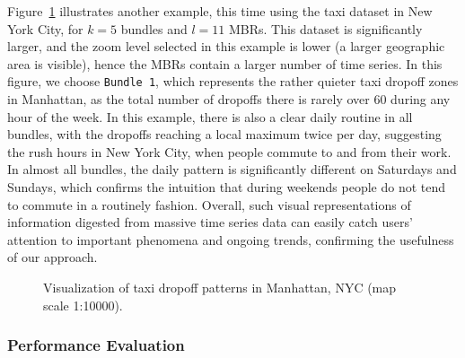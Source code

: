 Figure~\ref{fig:nyc_example} illustrates another example, this time using the taxi dataset in New York City, for $k=5$ bundles and $l=11$ MBRs. This dataset is significantly larger, and the zoom level selected in this example is lower (a larger geographic area is visible), hence the MBRs contain a larger number of time series. In this figure, we choose \texttt{Bundle 1}, which represents the rather quieter taxi dropoff zones in Manhattan, as the total number of dropoffs there is rarely over 60 during any hour of the week. In this example, there is also a clear daily routine in all bundles, with the dropoffs reaching a local maximum twice per day, suggesting the rush hours in New York City, when people commute to and from their work. In almost all bundles, the daily pattern is significantly different on Saturdays and Sundays, which confirms the intuition that during weekends people do not tend to commute in a routinely fashion. Overall, such visual representations of information digested from massive time series data can easily catch users' attention to important phenomena and ongoing trends, confirming the usefulness of our approach.

\begin{figure}[ht]
 \centering
 \caption{Visualization of taxi dropoff patterns in Manhattan, NYC (map scale 1:10000).}
 \label{fig:nyc_example}
\end{figure}

\subsubsection{Performance Evaluation}
\label{subsubsec:bundle_sum_benchmarking}

